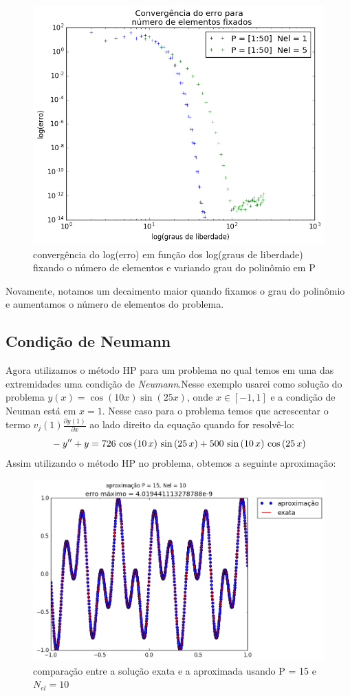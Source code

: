 \begin{figure}[!hb]
  \includegraphics[width=.7\textwidth,center]{figuras/convergencia_erro_EDO_p.png}
  \caption{convergência do log(erro) em função dos log(graus de liberdade) fixando o número de elementos e variando grau do polinômio em P  }
\end{figure}
 Novamente, notamos um decaimento maior quando fixamos o grau do polinômio e aumentamos o número de elementos do problema.
\pagebreak
\subsection{Condição de Neumann}
 Agora utilizamos o método HP para um problema no qual temos em uma das extremidades uma condição de \emph{Neumann}.Nesse exemplo usarei como solução do problema $y(x) = \cos(10 x) \sin(25 x)$, onde $ x \in [-1,1]$ e a condição de Neuman está em $x=1$. Nesse caso para o problema temos que acrescentar o termo  $v_j(1) \frac{\partial y(1)}{\partial x}$  ao lado direito da equação quando for resolvê-lo:
\begin{equation}
\\-y'' + y = 726\,\cos \left(10\,x\right)\,\sin \left(25\,x\right)+500\,\sin 
 \left(10\,x\right)\,\cos \left(25\,x\right) 
\end{equation}
 Assim utilizando o método HP no problema, obtemos a seguinte aproximação:

\begin{figure}[H]
\centering
\includegraphics[width=1.0\textwidth,center]{figuras/Neumm_10_15.png}
\caption{comparação entre a solução exata e a aproximada usando P = 15 e $N_{el} = 10$ } 
\end{figure}

